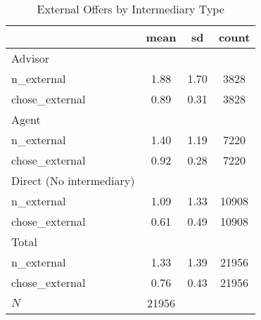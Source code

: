 \begin{table}[htbp]\centering
\def\sym#1{\ifmmode^{#1}\else\(^{#1}\)\fi}
\caption{External Offers by Intermediary Type}
\begin{tabular}{l*{1}{ccc}}
\hline\hline
            &        mean&          sd&       count\\
\hline
Advisor     &            &            &            \\
n\_external  &        1.88&        1.70&        3828\\
chose\_external&        0.89&        0.31&        3828\\
\hline
Agent       &            &            &            \\
n\_external  &        1.40&        1.19&        7220\\
chose\_external&        0.92&        0.28&        7220\\
\hline
Direct (No intermediary)&            &            &            \\
n\_external  &        1.09&        1.33&       10908\\
chose\_external&        0.61&        0.49&       10908\\
\hline
Total       &            &            &            \\
n\_external  &        1.33&        1.39&       21956\\
chose\_external&        0.76&        0.43&       21956\\
\hline
\(N\)       &       21956&            &            \\
\hline\hline
\end{tabular}
\end{table}
